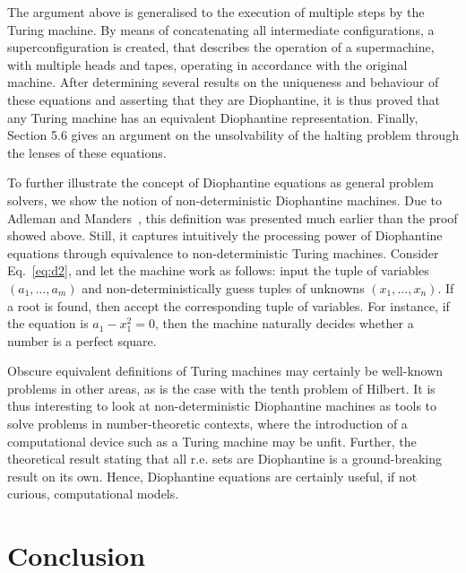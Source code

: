 \documentclass[12pt]{article}
\begin{document}
The argument above is generalised to the execution of multiple steps by the Turing machine. By means of concatenating all intermediate configurations, a superconfiguration is created, that describes the operation of a supermachine, with multiple heads and tapes, operating in accordance with the original machine. After determining several results on the uniqueness and behaviour of these equations and asserting that they are Diophantine, it is thus proved that any Turing machine has an equivalent Diophantine representation. Finally, Section 5.6 gives an argument on the unsolvability of the halting problem through the lenses of these equations.

To further illustrate the concept of Diophantine equations as general problem solvers, we show the notion of non-deterministic Diophantine machines. Due to Adleman and Manders~\cite[Sec. 3]{}, this definition was presented much earlier than the proof showed above. Still, it captures intuitively the processing power of Diophantine equations through equivalence to non-deterministic Turing machines. Consider Eq.~\ref{eq:d2}, and let the machine work as follows: input the tuple of variables $(a_{1}, \dots, a_{m})$ and non-deterministically guess tuples of unknowns $(x_{1}, \dots, x_{n})$. If a root is found, then accept the corresponding tuple of variables. For instance, if the equation is $a_{1} - x_{1}^{2} = 0$, then the machine naturally decides whether a number is a perfect square.

Obscure equivalent definitions of Turing machines may certainly be well-known problems in other areas, as is the case with the tenth problem of Hilbert. It is thus interesting to look at non-deterministic Diophantine machines as tools to solve problems in number-theoretic contexts, where the introduction of a computational device such as a Turing machine may be unfit. Further, the theoretical result stating that all r.e. sets are Diophantine is a ground-breaking result on its own. Hence, Diophantine equations are certainly useful, if not curious, computational models.

\section{Conclusion}\label{sec:conc}



\end{document}
